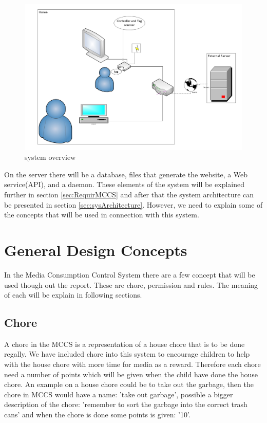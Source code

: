 \begin{figure}
	\centering
		\includegraphics[width=1.00\textwidth]{images/systemoverview.jpg}
	\caption{system overview}
	\label{fig:systemoverview}
\end{figure}

On the server there will be a database, files that generate the website, a Web service(API), and a daemon. These elements of the system will be explained further in section \vref{sec:RequirMCCS} and after that the system architecture can be presented in section \vref{sec:sysArchitecture}. However, we need to explain some of the concepts that will be used in connection with this system.

\section{General Design Concepts}
In the Media Consumption Control System there are a few concept that will be used though out the report. These are chore, permission and rules. The meaning of each will be explain in following sections.

\subsection{Chore}
A chore in the MCCS is a representation of a house chore that is to be done regally. We have included chore into this system to encourage children to help with the house chore with more time for media as a reward. Therefore each chore need a number of points which will be given when the child have done the house chore. 
An example on a house chore could be to take out the garbage, then the chore in MCCS would have a name: 'take out garbage', possible a bigger description of the chore: 'remember to sort the garbage into the correct trash cans' and when the chore is done some points is given: '10'.  

